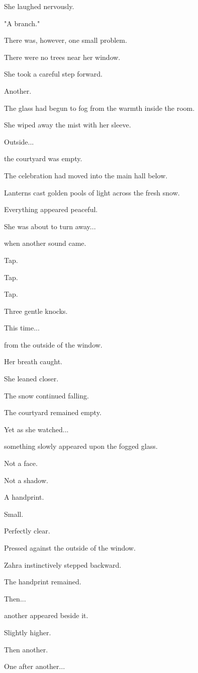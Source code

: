 \documentclass[12pt,openany]{book}
\begin{document}
She laughed nervously.

"A branch."

There was, however, one small problem.

There were no trees near her window.

She took a careful step forward.

Another.

The glass had begun to fog from the warmth inside the room.

She wiped away the mist with her sleeve.

Outside...

the courtyard was empty.

The celebration had moved into the main hall below.

Lanterns cast golden pools of light across the fresh snow.

Everything appeared peaceful.

She was about to turn away...

when another sound came.

Tap.

Tap.

Tap.

Three gentle knocks.

This time...

from the outside of the window.

Her breath caught.

She leaned closer.

The snow continued falling.

The courtyard remained empty.

Yet as she watched...

something slowly appeared upon the fogged glass.

Not a face.

Not a shadow.

A handprint.

Small.

Perfectly clear.

Pressed against the outside of the window.

Zahra instinctively stepped backward.

The handprint remained.

Then...

another appeared beside it.

Slightly higher.

Then another.

One after another...
\end{document}
